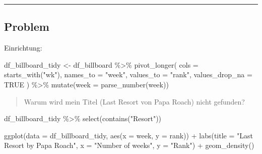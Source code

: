 \documentclass[
  letterpaper,
  DIV=11]{scrartcl}
\newenvironment{Shaded}{\begin{snugshade}}{\end{snugshade}}
\newcommand{\AttributeTok}[1]{\textcolor[rgb]{0.40,0.45,0.13}{#1}}
\newcommand{\ConstantTok}[1]{\textcolor[rgb]{0.56,0.35,0.01}{#1}}
\newcommand{\FunctionTok}[1]{\textcolor[rgb]{0.28,0.35,0.67}{#1}}
\newcommand{\NormalTok}[1]{\textcolor[rgb]{0.00,0.23,0.31}{#1}}
\newcommand{\OtherTok}[1]{\textcolor[rgb]{0.00,0.23,0.31}{#1}}
\newcommand{\SpecialCharTok}[1]{\textcolor[rgb]{0.37,0.37,0.37}{#1}}
\newcommand{\StringTok}[1]{\textcolor[rgb]{0.13,0.47,0.30}{#1}}
\begin{document}
\begin{center}\rule{0.5\linewidth}{0.5pt}\end{center}

\subsection{Problem}

Einrichtung:

\begin{Shaded}
\begin{Highlighting}[]
\NormalTok{df\_billboard\_tidy }\OtherTok{\textless{}{-}}\NormalTok{ df\_billboard }\SpecialCharTok{\%\textgreater{}\%} 
  \FunctionTok{pivot\_longer}\NormalTok{(}
    \AttributeTok{cols =} \FunctionTok{starts\_with}\NormalTok{(}\StringTok{"wk"}\NormalTok{), }
    \AttributeTok{names\_to =} \StringTok{"week"}\NormalTok{, }
    \AttributeTok{values\_to =} \StringTok{"rank"}\NormalTok{,}
    \AttributeTok{values\_drop\_na =} \ConstantTok{TRUE}
\NormalTok{  ) }\SpecialCharTok{\%\textgreater{}\%} 
  \FunctionTok{mutate}\NormalTok{(}\AttributeTok{week =} \FunctionTok{parse\_number}\NormalTok{(week))}
\end{Highlighting}
\end{Shaded}

\begin{quote}
Warum wird mein Titel (Last Resort von Papa Roach) nicht gefunden?
\end{quote}

\begin{Shaded}
\begin{Highlighting}[numbers=left,,]
\NormalTok{df\_billboard\_tidy }\SpecialCharTok{\%\textgreater{}\%}
  \FunctionTok{select}\NormalTok{(}\FunctionTok{contains}\NormalTok{(}\StringTok{"Resort"}\NormalTok{))}
\end{Highlighting}
\end{Shaded}

\begin{Shaded}
\begin{Highlighting}[numbers=left,,]
\FunctionTok{ggplot}\NormalTok{(}\AttributeTok{data =}\NormalTok{ df\_billboard\_tidy,}
  \FunctionTok{aes}\NormalTok{(}\AttributeTok{x =}\NormalTok{ week, }\AttributeTok{y =}\NormalTok{ rank)) }\SpecialCharTok{+}
  \FunctionTok{labs}\NormalTok{(}\AttributeTok{title =} \StringTok{"\textquotesingle{}Last Resort\textquotesingle{} by Papa Roach"}\NormalTok{,}
       \AttributeTok{x =} \StringTok{"Number of weeks"}\NormalTok{, }\AttributeTok{y =} \StringTok{"Rank"}\NormalTok{) }\SpecialCharTok{+}
  \FunctionTok{geom\_density}\NormalTok{()}
\end{Highlighting}
\end{Shaded}
\end{document}
